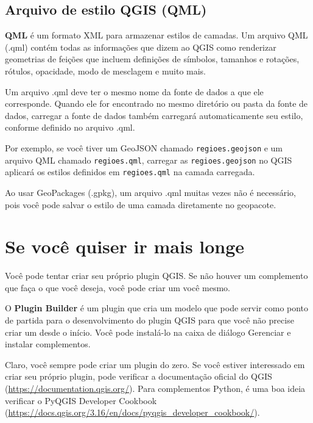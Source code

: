 \documentclass[
]{krantz}
\begin{document}
\hypertarget{arquivo-de-estilo-qgis-qml}{%
\subsection{Arquivo de estilo QGIS (QML)}\label{arquivo-de-estilo-qgis-qml}}

\textbf{QML} é um formato XML para armazenar estilos de camadas. Um arquivo QML (.qml) contém todas as informações que dizem ao QGIS como renderizar geometrias de feições que incluem definições de símbolos, tamanhos e rotações, rótulos, opacidade, modo de mesclagem e muito mais.

Um arquivo .qml deve ter o mesmo nome da fonte de dados a que ele corresponde. Quando ele for encontrado no mesmo diretório ou pasta da fonte de dados, carregar a fonte de dados também carregará automaticamente seu estilo, conforme definido no arquivo .qml.

Por exemplo, se você tiver um GeoJSON chamado \texttt{regioes.geojson} e um arquivo QML chamado \texttt{regioes.qml}, carregar as \texttt{regioes.geojson} no QGIS aplicará os estilos definidos em \texttt{regioes.qml} na camada carregada.

Ao usar GeoPackages (.gpkg), um arquivo .qml muitas vezes não é necessário, pois você pode salvar o estilo de uma camada diretamente no geopacote.

\hypertarget{se-vocuxea-quiser-ir-mais-longe-1}{%
\section{Se você quiser ir mais longe}\label{se-vocuxea-quiser-ir-mais-longe-1}}

Você pode tentar criar seu próprio plugin QGIS. Se não houver um complemento que faça o que você deseja, você pode criar um você mesmo.

O \textbf{Plugin Builder} é um plugin que cria um modelo que pode servir como ponto de partida para o desenvolvimento do plugin QGIS para que você não precise criar um desde o início. Você pode instalá-lo na caixa de diálogo Gerenciar e instalar complementos.

Claro, você sempre pode criar um plugin do zero. Se você estiver interessado em criar seu próprio plugin, pode verificar a documentação oficial do QGIS (\url{https://documentation.qgis.org/}). Para complementos Python, é uma boa ideia verificar o PyQGIS Developer Cookbook (\href{https://docs.qgis.org/3.16/en/docs/pyqgis_developer_cookbook\%20/}{https://docs.qgis.org/3.16/en/docs/pyqgis\_developer\_cookbook/}).
\end{document}
